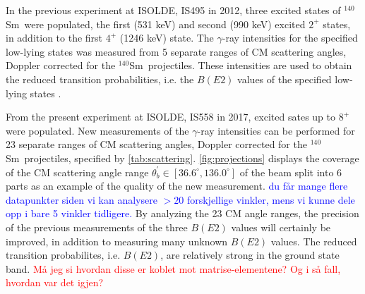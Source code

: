 \documentclass[twoside,english]{uiofysmaster/uiofysmaster}
\newcommand{\Sm}{$^{140}$Sm} %
\newcommand{\ga}{$\gamma$}
\let\orgautoref\autoref
\renewcommand{\autoref}
        {%
		 \def\sectionautorefname{Section}%
		 \def\subsectionautorefname{Section}%
		 \def\subsubsectionautorefname{Section}%
		 \def\chapterautorefname{Chapter}%
          \orgautoref}
\begin{document}
In the previous experiment at ISOLDE, IS495 in 2012, three excited states of \Sm\ were populated, the first (531 keV) and second (990 keV) excited $2^+$ states, in addition to the first $4^+$ (1246 keV) state.
The \ga-ray intensities for the specified low-lying states was measured from 5 separate ranges of CM scattering angles, Doppler corrected for the \Sm\ projectiles. 
These intensities are used to obtain the reduced transition probabilities, i.e. the $B(E2)$ values of the specified low-lying states \cite{Klintefjord2015, Klintefjord2016, BelloGarrote2015}.

From the present experiment at ISOLDE, IS558 in 2017, excited sates up to $8^+$ were populated. 
New measurements of the \ga-ray intensities can be performed for 23 separate ranges of CM scattering angles, Doppler corrected for the \Sm\ projectiles, specified by \autoref{tab:scattering}. 
\autoref{fig:projections} displays the coverage of the CM scattering angle range $\theta_b^{'} \in [36.6^\circ, 136.0^\circ]$ of the beam split into 6 parts as an example of the quality of the new measurement.
\textcolor{blue}{du får mange flere datapunkter siden vi kan analysere $>20$ forskjellige vinkler, mens vi kunne dele opp i bare 5 vinkler tidligere.} \newline
By analyzing the 23 CM angle ranges, the precision of the previous measurements of the three $B(E2)$ values will certainly be improved, in addition to measuring many unknown $B(E2)$ values.
The reduced transition probabilites, i.e. $B(E2)$, are relatively strong in the ground state band. 
\textcolor{red}{Må jeg si hvordan disse er koblet mot matrise-elementene? Og i så fall, hvordan var det igjen?}
\end{document}
